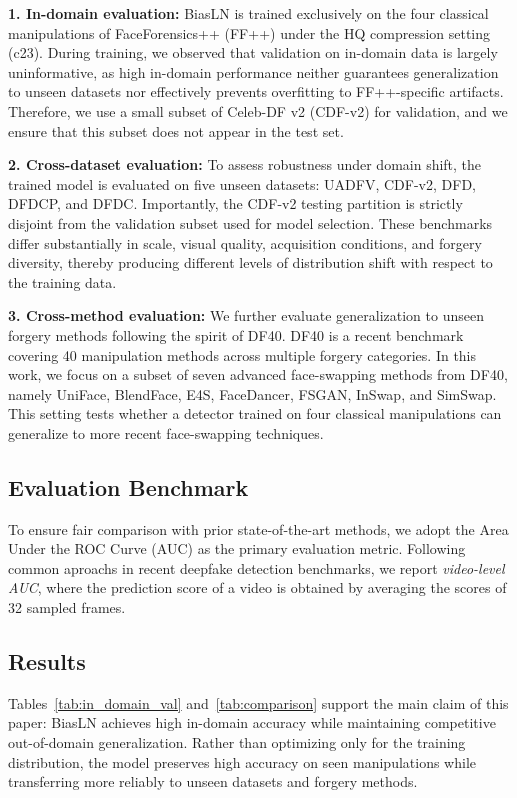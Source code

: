 \documentclass[fonts]{icst}
\begin{document}
\textbf{1. In-domain evaluation:}
BiasLN is trained exclusively on the four classical manipulations of FaceForensics++ (FF++) under the HQ compression setting (c23). During training, we observed that validation on in-domain data is largely uninformative, as high in-domain performance neither guarantees generalization to unseen datasets nor effectively prevents overfitting to FF++-specific artifacts. Therefore, we use a small subset of Celeb-DF v2 (CDF-v2) for validation, and we ensure that this subset does not appear in the test set.

\textbf{2. Cross-dataset evaluation:}
To assess robustness under domain shift, the trained model is evaluated on five unseen datasets: UADFV, CDF-v2, DFD, DFDCP, and DFDC. Importantly, the CDF-v2 testing partition is strictly disjoint from the validation subset used for model selection.
These benchmarks differ substantially in scale, visual quality, acquisition conditions, and forgery diversity, thereby producing different levels of distribution shift with respect to the training data.

\textbf{3. Cross-method evaluation:}
We further evaluate generalization to unseen forgery methods following the spirit of DF40.
DF40 is a recent benchmark covering 40 manipulation methods across multiple forgery categories.
In this work, we focus on a subset of seven advanced face-swapping methods from DF40, namely UniFace, BlendFace, E4S, FaceDancer, FSGAN, InSwap, and SimSwap.
This setting tests whether a detector trained on four classical manipulations can generalize to more recent face-swapping techniques.

\subsection{Evaluation Benchmark}

To ensure fair comparison with prior state-of-the-art methods, we adopt the Area Under the ROC Curve (AUC) as the primary evaluation metric.
Following common aproachs in recent deepfake detection benchmarks, we report \textit{video-level AUC}, where the prediction score of a video is obtained by averaging the scores of 32 sampled frames.

\subsection{Results}


Tables~\ref{tab:in_domain_val} and~\ref{tab:comparison} support the main claim of this paper: BiasLN achieves high in-domain accuracy while maintaining competitive out-of-domain generalization.
Rather than optimizing only for the training distribution, the model preserves high accuracy on seen manipulations while transferring more reliably to unseen datasets and forgery methods.
\end{document}
